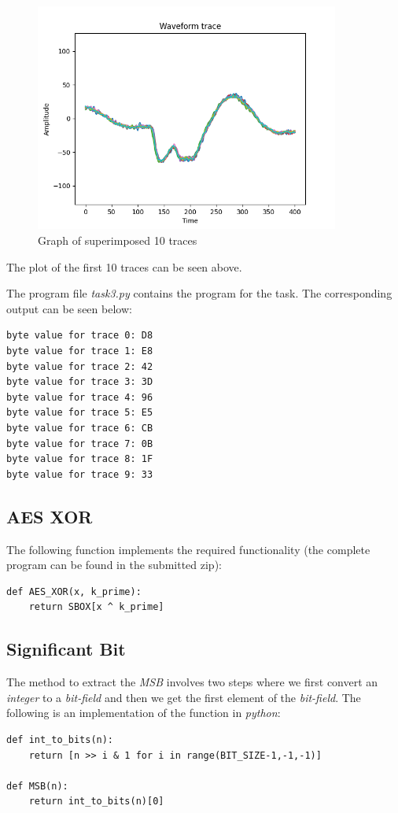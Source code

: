 \documentclass[1p,16pt]{elsarticle}
\begin{document}
\begin{figure}[H]
	\centering
    \centerline{\includegraphics[width=10cm]{traces_plot}}
    \caption{Graph of superimposed 10 traces}\label{fig:traces_plot}
\end{figure}

The plot of the first 10 traces can be seen above.
\par
The program file \textit{task3.py} contains the program for the task.
The corresponding output can be seen below:
\begin{verbatim}
byte value for trace 0: D8
byte value for trace 1: E8
byte value for trace 2: 42
byte value for trace 3: 3D
byte value for trace 4: 96
byte value for trace 5: E5
byte value for trace 6: CB
byte value for trace 7: 0B
byte value for trace 8: 1F
byte value for trace 9: 33
\end{verbatim}

\subsection{AES XOR}%
\label{ssub:aes_xor}
The following function implements the required functionality (the complete program can be found in the submitted zip):

\begin{verbatim}
def AES_XOR(x, k_prime):
    return SBOX[x ^ k_prime]
\end{verbatim}

\subsection{Significant Bit}%
\label{sub:significant_bit}
The method to extract the \textit{MSB} involves two steps where we first convert an \textit{integer}
to a \textit{bit-field} and then we get the first element of the \textit{bit-field}.
The following is an implementation of the function in \textit{python}:
\begin{verbatim}
def int_to_bits(n):
    return [n >> i & 1 for i in range(BIT_SIZE-1,-1,-1)]

def MSB(n):
    return int_to_bits(n)[0]
\end{verbatim}
\end{document}
